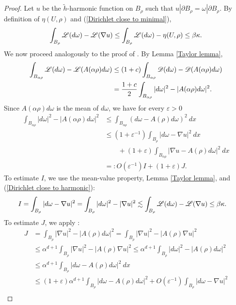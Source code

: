 \begin{proof}
Let $u$ be the $\tilde h$-harmonic function on $B_\rho$ such that $u|\partial B_\rho = \omega|\partial B_\rho$.
By definition of $\eta(U, \rho)$ and (\ref{Dirichlet close to minimal}),
\begin{equation}\label{Dirichlet close to harmonic}
\int_{B_\rho} \mathscr L(d\omega) - \mathscr L(\nabla u) \leq \int_{B_\rho} \mathscr L(d\omega) - \eta(U, \rho) \leq \beta\kappa.
\end{equation}
We now proceed analogously to the proof of \cite[Lemma 4.2]{Miranda66}. By Lemma \ref{Taylor lemma},
\begin{align*}
\int_{B_{\alpha\rho}} \mathscr L(d\omega) - \mathscr L(A(\alpha\rho)d\omega) &\leq (1 + c)\int_{B_{\alpha\rho}} \mathscr D(d\omega) - \mathscr D(A(\alpha\rho)d\omega) \\
&= \frac{1 + c}{2} \int_{B_{\alpha\rho}} |d\omega|^2 - |A(\alpha\rho)d\omega|^2.
\end{align*}
Since $A(\alpha\rho)d\omega$ is the mean of $d\omega$, we have for every $\varepsilon > 0$
\begin{align*}
\int_{B_{\alpha\rho}} |d\omega|^2 - |A(\alpha\rho)d\omega|^2 &\leq \int_{B_{\alpha\rho}} (d\omega - A(\rho)d\omega)^2 ~dx \\
&\leq (1 + \varepsilon^{-1})\int_{B_\rho} |d\omega - \nabla u|^2 ~dx\\
&\qquad + (1 + \varepsilon) \int_{B_{\alpha\rho}} |\nabla u - A(\rho)d\omega|^2 ~dx\\
&=: O(\varepsilon^{-1})I + (1 + \varepsilon)J.
\end{align*}
To estimate $I$, we use the mean-value property, Lemma \ref{Taylor lemma}, and (\ref{Dirichlet close to harmonic}):
\begin{align*}
I &= \int_{B_\rho} |d\omega - \nabla u|^2 = \int_{B_\rho} |d\omega|^2 - |\nabla u|^2 \lesssim \int_{B_\rho} \mathscr L(d\omega) - \mathscr L(\nabla u) \leq \beta \kappa.
\end{align*}
To estimate $J$, we apply \cite[Lemma 4.1]{Miranda66}:
\begin{align*}
J &= \int_{B_\rho} |\nabla u|^2 - |A(\rho)d\omega|^2 = \int_{B_\rho} |\nabla u|^2 - |A(\rho)\nabla u|^2 \\
&\leq \alpha^{d + 1} \int_{B_\rho} |\nabla u|^2 - |A(\rho)\nabla u|^2 \leq \alpha^{d + 1} \int_{B_\rho} |d\omega|^2 - |A(\rho)d\omega|^2 \\
&\leq \alpha^{d + 1} \int_{B_\rho} |d\omega - A(\rho)d\omega|^2 ~dx \\
&\leq (1 + \varepsilon)\alpha^{d + 1} \int_{B_\rho} |d\omega - A(\rho)d\omega|^2  + O(\varepsilon^{-1})\int_{B_\rho} |d\omega - \nabla u|^2\\

\end{align*}
\end{proof}
